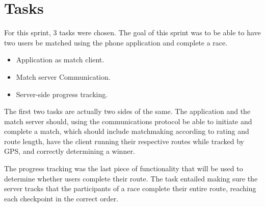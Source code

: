 \section{Tasks}
\label{sec:sprint4-tasks}

For this sprint, 3 tasks were chosen. The goal of this sprint was to be able to have two users be matched using the phone application and complete a race.

\begin{itemize}
 \item Application as match client.
 \item Match server Communication.
 \item Server-side progress tracking.
\end{itemize}

The first two tasks are actually two sides of the same. The application and the match server should, using the communications protocol be able to initiate and complete a match, which should include matchmaking according to rating and route length, have the client running their respective routes while tracked by \ac{GPS}, and correctly determining a winner.

The progress tracking was the last piece of functionality that will be used to determine whether users complete their route. The task entailed making sure the server tracks that the participants of a race complete their entire route, reaching each checkpoint in the correct order.
